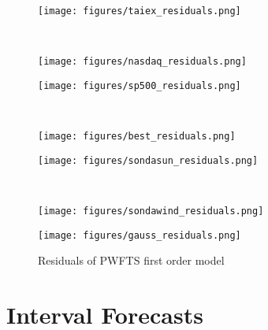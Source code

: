\begin{figure*}
\begin{center}
\begin{subfloat}[TAIEX]{
\texttt{[image: figures/taiex\_residuals.png]}
\label{fig:taiex_residuals}}
\end{subfloat}
~
\begin{subfloat}[NASDAQ]{
\texttt{[image: figures/nasdaq\_residuals.png]}
\label{fig:nasdaq_residuals}}
\end{subfloat}

\begin{subfloat}[S\&P 500]{
\texttt{[image: figures/sp500\_residuals.png]}
\label{fig:sp500_residuals}}
\end{subfloat}
~
\begin{subfloat}[BEST]{
\texttt{[image: figures/best\_residuals.png]}
\label{fig:best_residuals}}
\end{subfloat}

\begin{subfloat}{
\texttt{[image: figures/sondasun\_residuals.png]}
\label{fig:sondasun_residuals}}
\end{subfloat}
~
\begin{subfloat}{
\texttt{[image: figures/sondawind\_residuals.png]}
\label{fig:sondawind_residuals}}
\end{subfloat}

\begin{subfloat}{
\texttt{[image: figures/gauss\_residuals.png]}
\label{fig:gauss_residuals}}
\end{subfloat}

\caption{Residuals of PWFTS first order model}
\label{fig:residual_analysis}
\end{center}
\end{figure*}

\section{Interval Forecasts}


